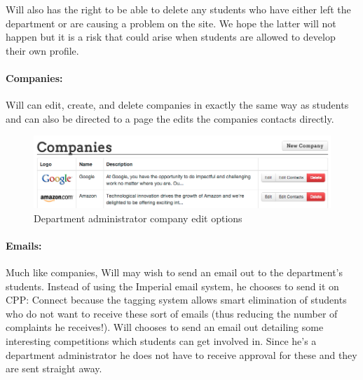     Will also has the right to be able to delete any students who have either left the department or are causing a problem on the site. We hope the latter will not happen but it is a risk that could arise when students are allowed to develop their own profile.

  \paragraph{Companies:}
    Will can edit, create, and delete companies in exactly the same way as students and can also be directed to a page the edits the companies contacts directly.

    \begin{figure}[H]\centering
    \includegraphics[scale=0.5]{images/user_experiences/admin/admin_company_edit_options}
    \caption{Department administrator company edit options}
    \end{figure}

  \paragraph{Emails:}
    Much like companies, Will may wish to send an email out to the department's students. Instead of using the Imperial email system, he chooses to send it on CPP: Connect because the tagging system allows smart elimination of students who do not want to receive these sort of emails (thus reducing the number of complaints he receives!). Will chooses to send an email out detailing some interesting competitions which students can get involved in. Since he's a department administrator he does not have to receive approval for these and they are sent straight away.
